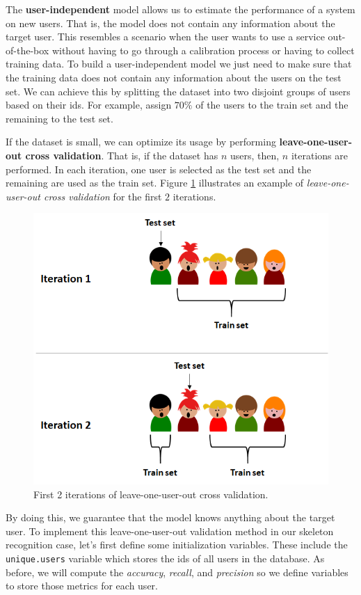\documentclass[
  11pt,
]{krantz}
\begin{document}
The \textbf{user-independent} model allows us to estimate the performance of a system on new users. That is, the model does not contain any information about the target user. This resembles a scenario when the user wants to use a service out-of-the-box without having to go through a calibration process or having to collect training data. To build a user-independent model we just need to make sure that the training data does not contain any information about the users on the test set. We can achieve this by splitting the dataset into two disjoint groups of users based on their ids. For example, assign \(70\%\) of the users to the train set and the remaining to the test set.

If the dataset is small, we can optimize its usage by performing \textbf{leave-one-user-out cross validation}. That is, if the dataset has \(n\) users, then, \(n\) iterations are performed. In each iteration, one user is selected as the test set and the remaining are used as the train set. Figure \ref{fig:loov} illustrates an example of \emph{leave-one-user-out cross validation} for the first \(2\) iterations.

\begin{figure}

{\centering \includegraphics[width=0.7\linewidth]{images/loov} 

}

\caption{First 2 iterations of leave-one-user-out cross validation.}\label{fig:loov}
\end{figure}

By doing this, we guarantee that the model knows anything about the target user. To implement this leave-one-user-out validation method in our skeleton recognition case, let's first define some initialization variables. These include the \texttt{unique.users} variable which stores the ids of all users in the database. As before, we will compute the \emph{accuracy}, \emph{recall}, and \emph{precision} so we define variables to store those metrics for each user.
\end{document}
